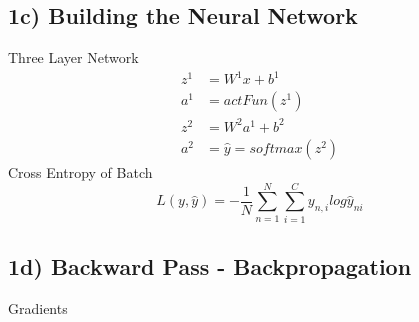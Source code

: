 \documentclass{article}
\begin{document}
\subsection*{1c) Building the Neural Network}
Three Layer Network
\begin{align}
	z^{1} &= W^{1}x + b^{1}\\
	a^{1} &=actFun(z^{1})\\
	z^{2} &=W^{2}a^{1}+b^{2}\\
	a^{2} &=\hat{y}=softmax(z^{2})
\end{align}
Cross Entropy of Batch
\begin{equation}
	L(y,\hat{y}) = -\frac{1}{N}\sum_{n=1}^{N}\sum_{i=1}^{C}y_{n,i}log{\hat{y}_{ni}}
\end{equation}

\subsection*{1d) Backward Pass - Backpropagation}
Gradients
\end{document}

